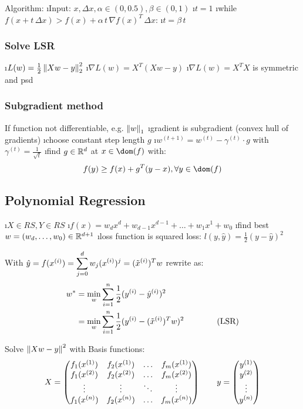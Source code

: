 Algorithm:
\be
\i Input: $x, \Delta x, \alpha \in (0,0.5), \beta \in (0,1)$
\i $t = 1$
\i while $f(x + t \, \Delta x) > f(x) + \alpha \, t \, \nabla f(x)^T \, \Delta x$:
\i \quad $t = \beta \, t$
\ee

\subsubsection{Solve LSR}

\be
\i $L(w) = \frac{1}{2} \left\lVert Xw-y\right\rVert_2^2$
\i $\nabla L(w) = X^T(Xw-y)$
\i $\nabla L(w) = X^TX$ is symmetric and psd
\ee

\subsubsection{Subgradient method} %

If function not differentiable, e.g. $\left\lVert w\right\rVert_1$
\bi
\i gradient is subgradient (convex hull of gradients)
\i choose constant step length $g$
\i $w^{(t+1)} = w^{(t)} - \gamma^{(t)} \cdot g$ with $\gamma^{(t)} = \frac{1}{\sqrt{t}}$
\i find $g \in \mathbb{R}^d$ at $x \in \dom(f)$ with: \[f(y) \geq f(x) + g^T(y-x), \forall y \in \dom(f)\]
\ei

\subsection{Polynomial Regression}

\bi
\i $X \in RS, Y \in RS$
\i $f(x) = w_dx^d + w_{d-1}x^{d-1} + \ldots + w_1x^1 + w_0$
\i find best $w = (w_d, \ldots, w_0) \in \mathbb{R}^{d+1}$
\i loss function is squared loss: $l(y, \hat y) = \frac{1}{2}(y - \hat y)^2$
\ei

\begin{samepage}
With $\hat y = f(x^{(i)}) = \displaystyle\sum^d_{j=0}w_j (x^{(i)})^j = (\tilde x ^{(i)})^T w$ rewrite as:
\begin{align*}
  w^* &= \min_w \displaystyle\sum^n_{i=1}\frac{1}{2}(y^{(i)} - \hat y^{(i)})^2\\
  &= \min_w \displaystyle\sum^n_{i=1}\frac{1}{2}(y^{(i)} - (\tilde x ^{(i)})^T w)^2 \text{\qquad\qquad (LSR)}
\end{align*}
\end{samepage}

Solve $\left\lVert Xw-y\right\rVert^2$ with Basis functions:
\[
X = \begin{pmatrix} f_1(x^{(1)}) & f_2(x^{(1)}) & \ldots & f_m(x^{(1)})\\
f_1(x^{(2)}) & f_2(x^{(2)}) & \ldots & f_m(x^{(2)})\\
\vdots & \vdots & \ddots & \vdots\\
f_1(x^{(n)}) & f_2(x^{(n)}) & \ldots & f_m(x^{(n)}) \end{pmatrix} \qquad y = \begin{pmatrix} y^{(1)}\\y^{(2)}\\\vdots\\y^{(n)} \end{pmatrix}
\]

